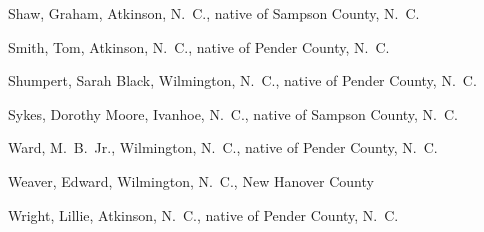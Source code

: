 \documentclass[11pt, a5paper]{book}
\begin{document}
\begin{thebibliography}{99}
  Shaw, Graham, Atkinson, N.~C., native of Sampson County, N.~C.

  Smith, Tom, Atkinson, N.~C., native of Pender County, N.~C.

  Shumpert, Sarah Black, Wilmington, N.~C., native of Pender County, N.~C.

  Sykes, Dorothy Moore, Ivanhoe, N.~C., native of Sampson County, N.~C.

  Ward, M.~B.~Jr., Wilmington, N.~C., native of Pender County, N.~C.

  Weaver, Edward, Wilmington, N.~C., New Hanover County

  Wright, Lillie, Atkinson, N.~C., native of Pender County, N.~C.

\end{thebibliography}

\printindex{}
\end{document}
